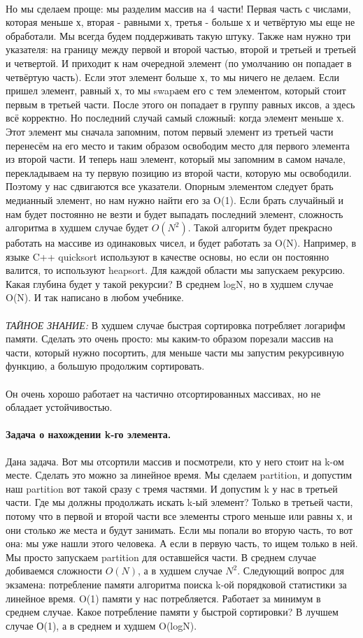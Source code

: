 \documentclass[a4paper,12pt]{article}
\begin{document}
\\Но мы сделаем проще: мы разделим массив на 4 части! Первая часть с числами, которая меньше х, вторая - равными х, третья - больше х и четвёртую мы еще не обработали. Мы всегда будем поддерживать такую штуку. Также нам нужно три указателя: на границу между первой и второй частью, второй и третьей и третьей и четвертой. И приходит к нам очередной элемент (по умолчанию он попадает в четвёртую часть). Если этот элемент больше х, то мы ничего не делаем. Если пришел элемент, равный х, то мы swapаем его с тем элементом, который стоит первым в третьей части. После этого он попадает в группу равных иксов, а здесь всё корректно. Но последний случай самый сложный: когда элемент меньше х. Этот элемент мы сначала запомним, потом первый элемент из третьей части перенесём на его место и таким образом освободим место для первого элемента из второй части. И теперь наш элемент, который мы запомним в самом начале, перекладываем на ту первую позицию из второй части, которую мы освободили. Поэтому у нас сдвигаются все указатели. Опорным элементом следует брать медианный элемент, но нам нужно найти его за O(1). Если брать случайный и нам будет постоянно не везти и будет выпадать последний элемент, сложность алгоритма в худшем случае будет $O(N^2)$. Такой алгоритм будет прекрасно работать на массиве из одинаковых чисел, и будет работать за O(N). Например, в языке C++ quicksort используют в качестве основы, но если он постоянно валится, то используют heapsort. Для каждой области мы запускаем рекурсию. Какая глубина будет у такой рекурсии? В среднем logN, но в худшем случае O(N). И так написано в любом учебнике. \\
\\
\textit{ТАЙНОЕ ЗНАНИЕ:} В худшем случае быстрая сортировка потребляет логарифм памяти. Сделать это очень просто: мы каким-то образом порезали массив на части, который нужно посортить, для меньше части мы запустим рекурсивную функцию, а большую продолжим сортировать. \\
\\
Он очень хорошо работает на частично отсортированных массивах, но не обладает устойчивостью.
\paragraph{Задача о нахождении k-го элемента.}
Дана задача. Вот мы отсортили массив и посмотрели, кто у него стоит на k-ом месте. Сделать это можно за линейное время. Мы сделаем partition, и допустим наш partition вот такой сразу с тремя частями. И допустим k у нас в третьей части. Где мы должны продолжать искать k-ый элемент? Только в третьей части, потому что в первой и второй части все элементы строго меньше или равны х, и они столько же места и будут занимать. Если мы попали во вторую часть, то вот она: мы уже нашли этого человека. А если в первую часть, то ищем только в ней. Мы просто запускаем partition для оставшейся части. В среднем случае добиваемся сложности $O(N)$, а в худшем случае $N^2$. Следующий вопрос для экзамена: потребление памяти алгоритма поиска k-ой порядковой статистики за линейное время. O(1) памяти у нас потребляется. Работает за минимум в среднем случае. Какое потребление памяти у быстрой сортировки? В лучшем случае О(1), а в среднем и худшем O(logN). 
\end{document}
